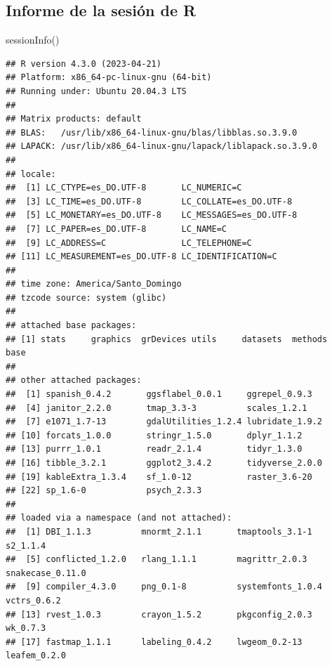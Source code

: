 \documentclass[spanish]{article}
\newenvironment{Shaded}{\begin{snugshade}}{\end{snugshade}}
\newcommand{\FunctionTok}[1]{\textcolor[rgb]{0.00,0.00,0.00}{#1}}
\newcommand{\NormalTok}[1]{#1}
\begin{document}
\hypertarget{informe-de-la-sesiuxf3n-de-r}{%
\subsection*{Informe de la sesión de
R}\label{informe-de-la-sesiuxf3n-de-r}}

\begin{Shaded}
\begin{Highlighting}[]
\FunctionTok{sessionInfo}\NormalTok{()}
\end{Highlighting}
\end{Shaded}

\begin{verbatim}
## R version 4.3.0 (2023-04-21)
## Platform: x86_64-pc-linux-gnu (64-bit)
## Running under: Ubuntu 20.04.3 LTS
## 
## Matrix products: default
## BLAS:   /usr/lib/x86_64-linux-gnu/blas/libblas.so.3.9.0 
## LAPACK: /usr/lib/x86_64-linux-gnu/lapack/liblapack.so.3.9.0
## 
## locale:
##  [1] LC_CTYPE=es_DO.UTF-8       LC_NUMERIC=C              
##  [3] LC_TIME=es_DO.UTF-8        LC_COLLATE=es_DO.UTF-8    
##  [5] LC_MONETARY=es_DO.UTF-8    LC_MESSAGES=es_DO.UTF-8   
##  [7] LC_PAPER=es_DO.UTF-8       LC_NAME=C                 
##  [9] LC_ADDRESS=C               LC_TELEPHONE=C            
## [11] LC_MEASUREMENT=es_DO.UTF-8 LC_IDENTIFICATION=C       
## 
## time zone: America/Santo_Domingo
## tzcode source: system (glibc)
## 
## attached base packages:
## [1] stats     graphics  grDevices utils     datasets  methods   base     
## 
## other attached packages:
##  [1] spanish_0.4.2       ggsflabel_0.0.1     ggrepel_0.9.3      
##  [4] janitor_2.2.0       tmap_3.3-3          scales_1.2.1       
##  [7] e1071_1.7-13        gdalUtilities_1.2.4 lubridate_1.9.2    
## [10] forcats_1.0.0       stringr_1.5.0       dplyr_1.1.2        
## [13] purrr_1.0.1         readr_2.1.4         tidyr_1.3.0        
## [16] tibble_3.2.1        ggplot2_3.4.2       tidyverse_2.0.0    
## [19] kableExtra_1.3.4    sf_1.0-12           raster_3.6-20      
## [22] sp_1.6-0            psych_2.3.3        
## 
## loaded via a namespace (and not attached):
##  [1] DBI_1.1.3          mnormt_2.1.1       tmaptools_3.1-1    s2_1.1.4          
##  [5] conflicted_1.2.0   rlang_1.1.1        magrittr_2.0.3     snakecase_0.11.0  
##  [9] compiler_4.3.0     png_0.1-8          systemfonts_1.0.4  vctrs_0.6.2       
## [13] rvest_1.0.3        crayon_1.5.2       pkgconfig_2.0.3    wk_0.7.3          
## [17] fastmap_1.1.1      labeling_0.4.2     lwgeom_0.2-13      leafem_0.2.0      

\end{verbatim}
\end{document}

